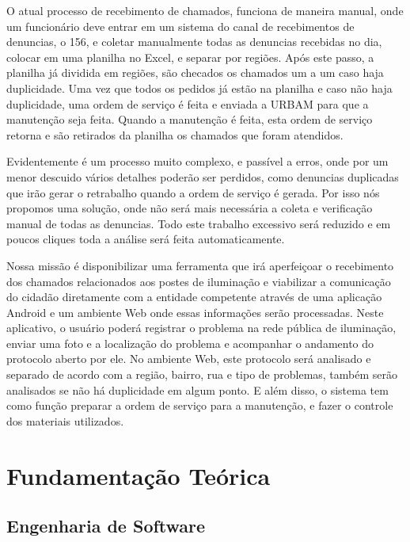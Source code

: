 \documentclass[
	article,			%
	11pt,				%
	oneside,			%
	a4paper,			%
	english,			%
	brazil,				%
	sumario=tradicional
	]{abntex2}
\begin{document}
O atual processo de recebimento de chamados, funciona de maneira manual, onde um funcionário deve entrar em um sistema do canal de recebimentos de denuncias, o 156, e coletar manualmente todas as denuncias recebidas no dia, colocar em uma planilha no Excel, e separar por regiões.
Após este passo, a planilha já dividida em regiões, são checados os chamados um a um caso haja duplicidade.
Uma vez que todos os pedidos já estão na planilha e caso não haja duplicidade, uma ordem de serviço é feita e enviada a URBAM para que a manutenção seja feita.
Quando a manutenção é feita, esta ordem de serviço retorna e são retirados da planilha os chamados que foram atendidos.

Evidentemente é um processo muito complexo, e passível a erros, onde por um menor descuido vários detalhes poderão ser perdidos, como denuncias duplicadas que irão gerar o retrabalho quando a ordem de serviço é gerada.
Por isso nós propomos uma solução, onde não será mais necessária a coleta e verificação manual de todas as denuncias.
Todo este trabalho excessivo será reduzido e em poucos cliques toda a análise será feita automaticamente.

Nossa missão é disponibilizar uma ferramenta que irá aperfeiçoar o recebimento dos chamados relacionados aos postes de iluminação e viabilizar a comunicação do cidadão diretamente com a entidade competente através de uma aplicação Android e um ambiente Web onde essas informações serão processadas.
Neste aplicativo, o usuário poderá registrar o problema na rede pública de iluminação, enviar uma foto e a localização do problema e acompanhar o andamento do protocolo aberto por ele.
No ambiente Web, este protocolo será analisado e separado de acordo com a região, bairro, rua e tipo de problemas, também serão analisados se não há duplicidade em algum ponto.
E além disso, o sistema tem como função preparar a ordem de serviço para a manutenção, e fazer o controle dos materiais utilizados.

\section{Fundamentação Teórica}

\subsection{Engenharia de Software}
\end{document}
